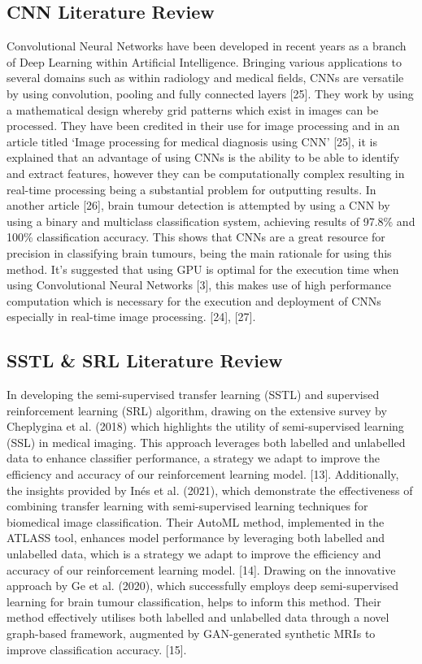 \documentclass[conference]{IEEEtran}
\begin{document}
\subsection{CNN Literature Review}
Convolutional Neural Networks have been developed in recent years as a branch of Deep Learning within Artificial Intelligence. Bringing various applications to several domains such as within radiology and medical fields, CNNs are versatile by using convolution, pooling and fully connected layers [25]. They work by using a mathematical design whereby grid patterns which exist in images can be processed. They have been credited in their use for image processing and in an article titled ‘Image processing for medical diagnosis using CNN’ [25], it is explained that an advantage of using CNNs is the ability to be able to identify and extract features, however they can be computationally complex resulting in real-time processing being a substantial problem for outputting results. In another article [26], brain tumour detection is attempted by using a CNN by using a binary and multiclass classification system, achieving results of 97.8\% and 100\% classification accuracy. This shows that CNNs are a great resource for precision in classifying brain tumours, being the main rationale for using this method. It’s suggested that using GPU is optimal for the execution time when using Convolutional Neural Networks [3], this makes use of high performance computation which is necessary for the execution and deployment of CNNs especially in real-time image processing. [24], [27].

\subsection{SSTL \& SRL  Literature Review}
In developing the semi-supervised transfer learning (SSTL) and supervised reinforcement learning (SRL) algorithm, drawing on the extensive survey by Cheplygina et al. (2018) which highlights the utility of semi-supervised learning (SSL) in medical imaging. This approach leverages both labelled and unlabelled data to enhance classifier performance, a strategy we adapt to improve the efficiency and accuracy of our reinforcement learning model. [13]. Additionally, the insights provided by Inés et al. (2021), which demonstrate the effectiveness of combining transfer learning with semi-supervised learning techniques for biomedical image classification. Their AutoML method, implemented in the ATLASS tool, enhances model performance by leveraging both labelled and unlabelled data, which is a strategy we adapt to improve the efficiency and accuracy of our reinforcement learning model. [14]. Drawing on the innovative approach by Ge et al. (2020), which successfully employs deep semi-supervised learning for brain tumour classification, helps to inform this method. Their method effectively utilises both labelled and unlabelled data through a novel graph-based framework, augmented by GAN-generated synthetic MRIs to improve classification accuracy. [15].
\end{document}
